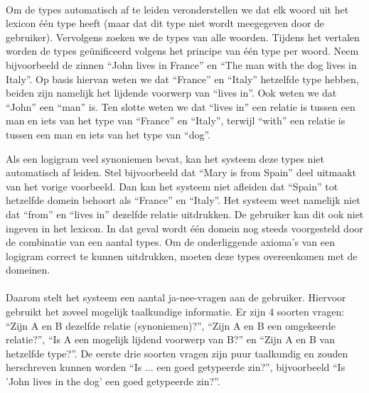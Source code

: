 \paragraph{} Om de types automatisch af te leiden veronderstellen we dat elk woord uit het lexicon één type heeft (maar dat dit type niet wordt meegegeven door de gebruiker). Vervolgens zoeken we de types van alle woorden. Tijdens het vertalen worden de types geünificeerd volgens het principe van één type per woord. Neem bijvoorbeeld de zinnen ``John lives in France'' en ``The man with the dog lives in Italy''. Op basis hiervan weten we dat ``France'' en ``Italy'' hetzelfde type hebben, beiden zijn namelijk het lijdende voorwerp van ``lives in''. Ook weten we dat ``John'' een ``man'' is. Ten slotte weten we dat ``lives in'' een relatie is tussen een man en iets van het type van ``France'' en ``Italy'', terwijl ``with'' een relatie is tussen een man en iets van het type van ``dog''.

Als een logigram veel synoniemen bevat, kan het systeem deze types niet automatisch af leiden. Stel bijvoorbeeld dat ``Mary is from Spain'' deel uitmaakt van het vorige voorbeeld. Dan kan het systeem niet afleiden dat ``Spain'' tot hetzelfde domein behoort als ``France'' en ``Italy''. Het systeem weet namelijk niet dat ``from'' en ``lives in'' dezelfde relatie uitdrukken. De gebruiker kan dit ook niet ingeven in het lexicon. In dat geval wordt één domein nog steeds voorgesteld door de combinatie van een aantal types. Om de onderliggende axioma's van een logigram correct te kunnen uitdrukken, moeten deze types overeenkomen met de domeinen.


\paragraph{} Daarom stelt het systeem een aantal ja-nee-vragen aan de gebruiker. Hiervoor gebruikt het zoveel mogelijk taalkundige informatie. Er zijn 4 soorten vragen: ``Zijn A en B dezelfde relatie (synoniemen)?'', ``Zijn A en B een omgekeerde relatie?'', ``Is A een mogelijk lijdend voorwerp van B?'' en ``Zijn A en B van hetzelfde type?''. De eerste drie soorten vragen zijn puur taalkundig en zouden herschreven kunnen worden ``Is ... een goed getypeerde zin?'', bijvoorbeeld ``Is 'John lives in the dog' een goed getypeerde zin?''.

